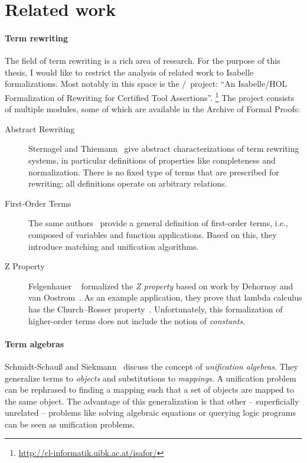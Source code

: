 
\section{Related work}

\paragraph{Term rewriting}
The field of term rewriting is a rich area of research.
For the purpose of this thesis, I would like to restrict the analysis of related work to Isabelle formalizations.
Most notably in this space is the \isafor/\ceta\ project: ``An Isabelle/HOL Formalization of Rewriting for Certified Tool Assertions''.%
\footnote{\url{http://cl-informatik.uibk.ac.at/isafor/}}
The project consists of multiple modules, some of which are available in the Archive of Formal Proofs:

\begin{description}
  \item[Abstract Rewriting]
    Sternagel and Thiemann~\cite{sternagel2010rewriting} give abstract characterizations of term rewriting systems, in particular definitions of properties like completeness and normalization.
    There is no fixed type of terms that are prescribed for rewriting; all definitions operate on arbitrary relations.
  \item[First-Order Terms]
    The same authors~\cite{sternagel2018terms} provide a general definition of first-order terms, i.e., composed of variables and function applications.
    Based on this, they introduce matching and unification algorithms.
  \item[Z Property]
    Felgenhauer \etal~\cite{felgenhauer2016z} formalized the \emph{Z property} based on work by Dehornoy and van Oostrom~\cite{dehornoy2008z}.
    As an example application, they prove that lambda calculus has the Church--Rosser property~\cite{church1936conversion}.
    Unfortunately, this formalization of higher-order terms does not include the notion of \emph{constants}.
\end{description}

\paragraph{Term algebras}
Schmidt-Schauß and Siekmann~\cite{schmidt1988unification} discuss the concept of \emph{unification algebras}.
They generalize terms to \emph{objects} and substitutions to \emph{mappings}.
A unification problem can be rephrased to finding a mapping such that a set of objects are mapped to the same object.
The advantage of this generalization is that other -- superficially unrelated -- problems like solving algebraic equations or querying logic programs can be seen as unification problems.

